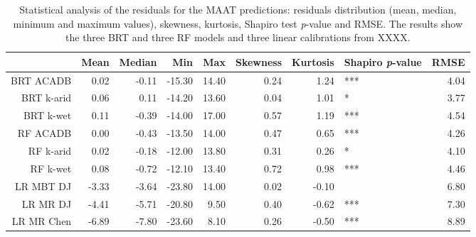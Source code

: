 \begin{table}[ht]
\centering
\caption{Statistical analysis of the residuals for the MAAT predictions: residuals distribution (mean, median, minimum and maximum values), skewness, kurtosis, Shapiro test \textit{p}-value and RMSE. The results show the three BRT and three RF models and three linear calibrations from XXXX.} 
\label{SI_Table_res}
\begin{tabular}{rrrrrrrlr}
  \toprule
 & Mean & Median & Min & Max & Skewness & Kurtosis & Shapiro \textit{p}-value & RMSE \\ 
  \midrule
BRT ACADB & 0.02 & -0.11 & -15.30 & 14.40 & 0.24 & 1.24 & *** & 4.04 \\ 
  BRT k-arid & 0.06 & 0.11 & -14.20 & 13.60 & 0.04 & 1.01 & * & 3.77 \\ 
  BRT k-wet & 0.11 & -0.39 & -14.00 & 17.00 & 0.57 & 1.19 & *** & 4.54 \\ 
  RF ACADB & 0.00 & -0.43 & -13.50 & 14.00 & 0.47 & 0.65 & *** & 4.26 \\ 
  RF k-arid & 0.02 & -0.18 & -12.00 & 13.80 & 0.31 & 0.26 & * & 4.10 \\ 
  RF k-wet & 0.08 & -0.72 & -12.10 & 13.40 & 0.72 & 0.98 & *** & 4.46 \\ 
  LR MBT DJ & -3.33 & -3.64 & -23.80 & 14.00 & 0.02 & -0.10 &   & 6.80 \\ 
  LR MR DJ & -4.41 & -5.71 & -20.80 & 9.50 & 0.40 & -0.62 & *** & 7.30 \\ 
  LR MR Chen & -6.89 & -7.80 & -23.60 & 8.10 & 0.26 & -0.50 & *** & 8.89 \\ 
   \bottomrule
\end{tabular}
\end{table}
